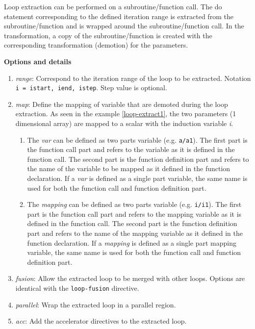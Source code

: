 \documentclass{article}
\begin{document}
Loop extraction can be performed on a subroutine/function call. The do statement corresponding
to the defined iteration range is extracted from the subroutine/function and is wrapped
around the subroutine/function call. In the transformation, a copy of the subroutine/function
is created with the corresponding transformation (demotion) for the parameters.


\textbf{Options and details}
\begin{enumerate}
\item \textit{range}: Correspond to the iteration range of the loop to be extracted.
  Notation \lstinline!i = istart, iend, istep!. Step value is optional. 
\item \textit{map}: Define the mapping of variable that are demoted during the loop
  extraction. As seen in the example \ref{loop-extract1}, the two parameters (1 dimensional array)
  are mapped to a scalar with the induction variable \textit{i}.
  \begin{enumerate}
    \item The \textit{var} can be defined as two parts variable (e.g. \lstinline!a/a1!). The
    first part is the function call part and refers to the variable as it is
    defined in the function call. The second part is the function definition
    part and refers to the name of the variable to be mapped as it defined in
    the function declaration. If a \textit{var} is defined as a single part variable,
    the same name is used for both the function call and function definition
    part.
    \item The \textit{mapping} can be defined as two parts variable (e.g. \lstinline!i/i1!). The
    first part is the function call part and refers to the mapping variable as
    it is defined in the function call. The second part is the function
    definition part and refers to the name of the mapping variable as it defined
    in the function declaration. If a \textit{mapping} is defined as a single part
    mapping variable, the same name is used for both the function call and
    function definition part.
    \end{enumerate}
\item \textit{fusion}: Allow the extracted loop to be merged with other loops.
Options are identical with the \lstinline!loop-fusion! directive.
\item \textit{parallel}: Wrap the extracted loop in a parallel region.
\item \textit{acc}: Add the accelerator directives to the extracted loop.
\end{enumerate}
\end{document}
